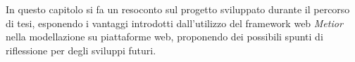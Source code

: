 In questo capitolo si fa un resoconto sul progetto sviluppato durante il percorso di tesi, esponendo i vantaggi introdotti
dall'utilizzo del framework web \emph{Metior} nella modellazione su piattaforme web, proponendo dei possibili spunti di riflessione
per degli sviluppi futuri.
